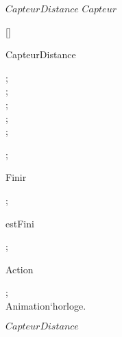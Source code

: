 \kClass $CapteurDistance$ \kISO $Capteur$
\par
\kInstanceVarDef
\parlinebr
\begin{insvar}
[{\False }]
\end{insvar}
\par
\kOperations
{}\begin{op}[e]{CapteurDistance}%
\signature{\Nat  \Mult Controleur`typeActeur \Mult \mapof{\Nat \Gmap \Int } \Mult Contexte \Mult \Natone  \Mult \Bool  \Oto CapteurDistance}
\begin{blockstmt}
 ; \\
 ; \\
 ; \\
 ; \\
 ; \\
\end{blockstmt};
\end{op}
\begin{op}[e]{Finir}%
\signature{() \Oto ()}
\parms{}
;
\end{op}
\begin{op}[e]{estFini}%
\signature{() \Oto ()}
\parms{}
\Skip ;
\end{op}
\begin{op}[e]{Action}%
\signature{() \Oto ()}
\parms{}
\begin{blockstmt}
\end{blockstmt}
\end{op}
\kThreadDef
\begin{thread}
\begin{while}{\True }
\begin{blockstmt}
 ; \\
Animation`horloge.
\end{blockstmt}
\end{while}
\end{thread}
\kSync
{}
\kEnd $CapteurDistance$

